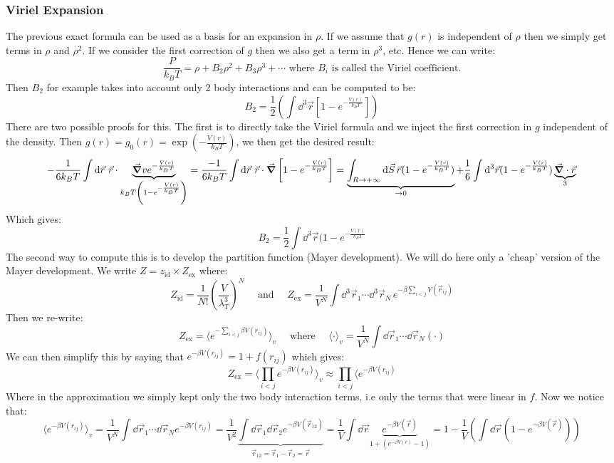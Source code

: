 \documentclass[10pt,a4paper]{book}
\begin{document}
\subsubsection{Viriel Expansion}
The previous exact formula can be used as a basis for an expansion in $\rho$. If we assume that $g(r)$ is independent of $\rho$ then we simply get terms in $\rho$ and $\rho^2$. If we consider the first correction of $g$ then we also get a term in $\rho^3$, etc. Hence we can write:
\[
\frac{P}{k_B T} = \rho + B_2 \rho^2 + B_3 \rho^3 + \cdots \text{ where } B_i \text{ is called the Viriel coefficient.}
\]
Then $B_2$ for example takes into account only 2 body interactions and can be computed to be:
\[
B_2 = \frac{1}{2}\left( \int \dd^3 \vec{r} \left[1 - e^{-\frac{V(r)}{k_B T}}\right] \right)
\]
There are two possible proofs for this. The first is to directly take the Viriel formula and we inject the first correction in $g$ independent of the density. Then $g(r) = g_0(r) = \exp(-\frac{V(r)}{k_B T})$, we then get the desired result:
\[
-\frac{1}{6 k_B T} \int \dd \vec{r}\,\, \vec{r} \cdot \underbrace{\vec{\grad} v e^{-\frac{V(r)}{k_B T}}}_{k_B T \left(1 - e^{-\frac{V(r)}{k_B T}}\right)} = \frac{-1}{6 k_B T} \int \dd \vec{r} \,\, \vec{r} \cdot \vec{\grad} \left[ 1 - e^{-\frac{V(r)}{k_B T}} \right] = \underbrace{\int_{R \to +\infty} \dd \vec{S} \, \vec{r} (1 - e^{-\frac{V(r)}{k_B T}})}_{\to 0} + \frac{1}{6} \int \dd^3 \vec{r} (1 - e^{-\frac{V(r)}{k_B T}}) \underbrace{\vec{\grad} \cdot \vec{r}}_{3}
\]
Which gives:
\[
B_2 = \frac{1}{2} \int \dd^3 \vec{r} (1 - e^{-\frac{V(r)}{k_B T}}
\]
The second way to compute this is to develop the partition function (Mayer development). We will do here only a 'cheap' version of the Mayer development. We write $Z = z_\text{id} \times Z_\text{ex}$ where:
\[
Z_\text{id} = \frac{1}{N!}\left(\frac{V}{\lambda^3_T}\right)^N \quad \text{ and } \quad Z_\text{ex} = \frac{1}{V^N} \int \dd^3 \vec{r}_1 \cdots \dd^3\vec{r}_N \, e^{-\beta \sum_{i < j} V(\vec{r}_{ij})}
\]
Then we re-write:
\[
Z_\text{ex} = \langle e^{-\sum_{i < j} \beta V(r_{ij})} \rangle_v \quad \text{ where } \quad \langle \cdot \rangle_v = \frac{1}{V^N} \int \dd \vec{r}_1 \cdots \dd \vec{r}_N (\cdot)
\]
We can then simplify this by saying that $e^{-\beta V(r_{ij})} = 1 + f(r_{ij})$ which gives:
\[
Z_\text{ex} = \langle \prod_{i < j} e^{-\beta V(r_{ij})} \rangle_v \approx \prod_{i < j} \langle e^{-\beta V(r_{ij})}
\]
Where in the approximation we simply kept only the two body interaction terms, i.e only the terms that were linear in $f$. Now we notice that:
\[
\langle e^{-\beta V(r_{ij})}\rangle_v = \frac{1}{V^N} \int \dd \vec{r}_1 \cdots \dd \vec{r}_N e^{-\beta V(r_{ij})} = \frac{1}{V^2} \underbrace{\int \dd \vec{r}_1 \dd \vec{r}_2 e^{-\beta V(\vec{r}_{12})}}_{\vec{r}_{12} = \vec{r}_1 - \vec{r}_2 = \vec{r}} = \frac{1}{V} \int \dd \vec{r} \underbrace{e^{-\beta V(\vec{r})}}_{1 + (e^{-\beta V(r)} - 1)} = 1 - \frac{1}{V} \left(\int \dd \vec{r} (1 - e^{-\beta V(\vec{r})}) \right)
\]
\end{document}
